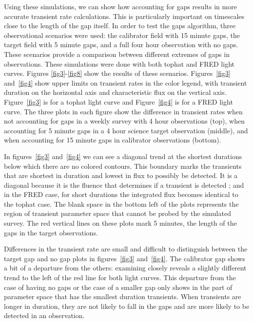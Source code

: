 \documentclass[12pt]{article}
\begin{document}
Using these simulations, we can show how accounting for gaps results in more accurate transient rate calculations. This is particularly important on timescales close to the length of the gap itself. In order to test the gaps algorithm, three observational scenarios were used: the calibrator field with 15 minute gaps, the target field with 5 minute gaps, and a full four hour observation with no gaps. These scenarios provide a comparison between different extremes of gaps in observations. These simulations were done with both tophat and FRED light curves. Figures \ref{fig3}-\ref{fig8} show the results of these scenarios. Figures~\ref{fig3} and~\ref{fig4} show upper limits on transient rates in the color legend, with transient duration on the horizontal axis and characteristic flux on the vertical axis. Figure~\ref{fig3} is for a tophat light curve and Figure~\ref{fig4} is for a FRED light curve. The three plots in each figure show the difference in transient rates when not accounting for gaps in a weekly survey with 4 hour observations (top), when accounting for 5 minute gaps in a 4 hour science target observation (middle), and when accounting for 15 minute gaps in calibrator observations (bottom). 

In figures~\ref{fig3} and~\ref{fig4} we can see a diagonal trend at the shortest durations below which there are no colored contours. This boundary marks the transients that are shortest in duration and lowest in flux to possibly be detected. It is a diagonal because it is the fluence that determines if a transient is detected \citep{2017MNRAS.465.4106C}; and in the FRED case, for short durations the integrated flux becomes identical to the tophat case. The blank space in the bottom left of the plots represents the region of transient parameter space that cannot be probed by the simulated survey. The red vertical lines on these plots mark 5 minutes, the length of the gaps in the target observations. 

Differences in the transient rate are small and difficult to distinguish between the target gap and no gap plots in figures~\ref{fig3} and~\ref{fig4}. The calibrator gap shows a bit of a departure from the others: examining closely reveals a slightly different trend to the left of the red line for both light curves. This departure from the case of having no gaps or the case of a smaller gap only shows in the part of parameter space that has the smallest duration transients. When transients are longer in duration, they are not likely to fall in the gaps and are more likely to be detected in an observation. 
\end{document}
